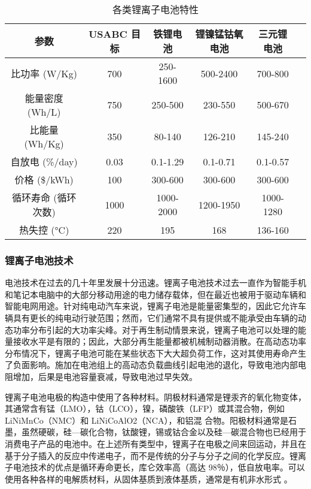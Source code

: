 \begin{table}
	\centering
	\caption{各类锂离子电池特性} \label{tab:LiUSABC}
	\begin{tabular*}{0.9\textwidth}{@{\extracolsep{\fill}}cccccc}
		\toprule
		参数 & USABC 目标 & 铁锂电池 & 锂镍锰钴氧电池 & 三元锂电池 \\
		\midrule
		比功率 (W/Kg)&700&250-1600&500-2400&700-800\\
		能量密度 (Wh/L)&750&250-500&230-550&500-670\\
		比能量 (Wh/Kg)&350&80-140 &126-210&145-240\\
		自放电 (\%/day)&0.03&0.1-1.29&0.1-0.71&0.1-0.57\\
		价格 (\$/kWh)&100&300-600&300-600&300-600\\
		循环寿命 (循环次数)&1000&1000-2000&1200-1950&1000-1280\\
		热失控 (°C)&220&195&168&136-160\\
		\bottomrule
	\end{tabular*}
\end{table}

\subsubsection{锂离子电池技术}
电池技术在过去的几十年里发展十分迅速。锂离子电池技术过去一直作为智能手机和笔记本电脑中的大部分移动用途的电力储存载体，但在最近也被用于驱动车辆和智能电网用途。针对纯电动汽车来说，锂离子电池是能量密集型的，因此它允许车辆具有更长的纯电动行驶范围；然而，它们通常不具有提供或不能承受由车辆的动态功率分布引起的大功率尖峰。对于再生制动情景来说，锂离子电池可以处理的能量接收水平是有限的；因此，大部分再生能量都被机械制动器消散。在高动态功率分布情况下，锂离子电池可能在某些状态下大大超负荷工作，这对其使用寿命产生了负面影响。施加在电池组上的高动态负载曲线引起电池的退化，导致电池内部电阻增加，后果是电池容量衰减，导致电池过早失效。

锂离子电池电极的构造中使用了各种材料。阴极材料通常是锂汞齐的氧化物变体，其通常含有锰（LMO），钴（LCO），镍，磷酸铁（LFP）或其混合物，例如 LiNiMnCo（NMC）和 LiNiCoAlO2（NCA），和铝混
合物。阳极材料通常是石墨，虽然硬碳，硅—碳化合物，钛酸锂，锡或钴合金以及硅—碳混合物也已经用于消费电子产品的电池中。在上述所有类型中，锂离子在电极之间来回运动，并且在基于分子插入的反应中传递电子，而不是传统的分子与分子之间的化学反应。锂离子电池技术的优点是循环寿命更长，库仑效率高（高达 98％），低自放电率。可以使用各种各样的电解质材料，从固体基质到液体基质，通常是有机非水形式 \cite{nengliangchucun}。

